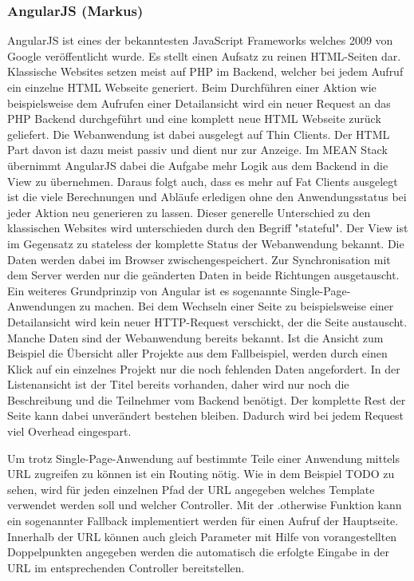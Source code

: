 \subsubsection{AngularJS (Markus)}\label{angularjs-markus}

AngularJS ist eines der bekanntesten JavaScript Frameworks welches 2009 von Google veröffentlicht wurde. 
Es stellt einen Aufsatz zu reinen HTML-Seiten dar. 
Klassische Websites setzen meist auf PHP im Backend, welcher bei jedem Aufruf ein einzelne HTML Webseite generiert.
Beim Durchführen einer Aktion wie beispielsweise dem Aufrufen einer Detailansicht wird ein neuer Request an das PHP Backend durchgeführt und eine komplett neue HTML Webseite zurück geliefert.
Die Webanwendung ist dabei ausgelegt auf Thin Clients.
Der HTML Part davon ist dazu meist passiv und dient nur zur Anzeige.
Im MEAN Stack übernimmt AngularJS dabei die Aufgabe mehr Logik aus dem Backend in die View zu übernehmen.
Daraus folgt auch, dass es mehr auf Fat Clients ausgelegt ist die viele Berechnungen und Abläufe erledigen ohne den Anwendungsstatus bei jeder Aktion neu generieren zu lassen.
Dieser generelle Unterschied zu den klassischen Websites wird unterschieden durch den Begriff "stateful".
Der View ist im Gegensatz zu stateless der komplette Status der Webanwendung bekannt.
Die Daten werden dabei im Browser zwischengespeichert.
Zur Synchronisation mit dem Server werden nur die geänderten Daten in beide Richtungen ausgetauscht.
Ein weiteres Grundprinzip von Angular ist es sogenannte Single-Page-Anwendungen zu machen.
Bei dem Wechseln einer Seite zu beispielsweise einer Detailansicht wird kein neuer HTTP-Request verschickt, der die Seite austauscht.
Manche Daten sind der Webanwendung bereits bekannt.
Ist die Ansicht zum Beispiel die Übersicht aller Projekte aus dem Fallbeispiel, werden durch einen Klick auf ein einzelnes Projekt nur die noch fehlenden Daten angefordert.
In der Listenansicht ist der Titel bereits vorhanden, daher wird nur noch die Beschreibung und die Teilnehmer vom Backend benötigt.
Der komplette Rest der Seite kann dabei unverändert bestehen bleiben.
Dadurch wird bei jedem Request viel Overhead eingespart.

Um trotz Single-Page-Anwendung auf bestimmte Teile einer Anwendung mittels URL zugreifen zu können ist ein Routing nötig.
Wie in dem Beispiel TODO zu sehen, wird für jeden einzelnen Pfad der URL angegeben welches Template verwendet werden soll und welcher Controller.
Mit der .otherwise Funktion kann ein sogenannter Fallback implementiert werden für einen Aufruf der Hauptseite.
Innerhalb der URL können auch gleich Parameter mit Hilfe von vorangestellten Doppelpunkten angegeben werden die automatisch die erfolgte Eingabe in der URL im entsprechenden Controller bereitstellen.

